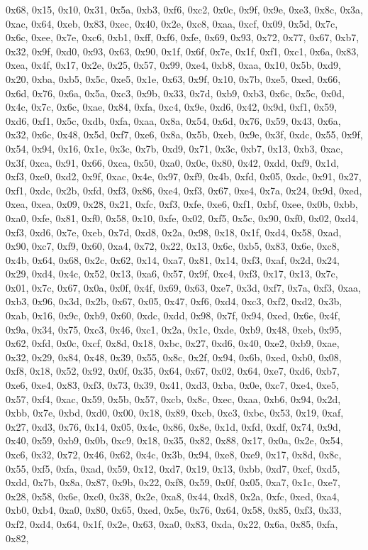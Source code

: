 \documentclass[
]{book}
\begin{document}
0x68, 0x15, 0x10, 0x31, 0x5a, 0xb3, 0xf6, 0xc2, 0x0c, 0x9f, 0x9e, 0xe3, 0x8c, 0x3a, 0xac, 0x64, 0xeb, 0x83, 0xec, 0x40, 0x2e, 0xc8, 0xaa, 0xcf, 0x09, 0x5d, 0x7c, 0x6c, 0xee, 0x7e, 0xc6, 0xb1, 0xff, 0xf6, 0xfe, 0x69, 0x93, 0x72, 0x77, 0x67, 0xb7, 0x32, 0x9f, 0xd0, 0x93, 0x63, 0x90, 0x1f, 0x6f, 0x7e, 0x1f, 0xf1, 0xc1, 0x6a, 0x83, 0xea, 0x4f, 0x17, 0x2e, 0x25, 0x57, 0x99, 0xe4, 0xb8, 0xaa, 0x10, 0x5b, 0xd9, 0x20, 0xba, 0xb5, 0x5c, 0xe5, 0x1e, 0x63, 0x9f, 0x10, 0x7b, 0xe5, 0xed, 0x66, 0x6d, 0x76, 0x6a,
0x5a, 0xc3, 0x9b, 0x33, 0x7d, 0xb9, 0xb3, 0x6c, 0x5c, 0x0d, 0x4c, 0x7c, 0x6c, 0xae, 0x84, 0xfa, 0xc4, 0x9e, 0xd6, 0x42, 0x9d, 0xf1, 0x59, 0xd6, 0xf1, 0x5c, 0xdb, 0xfa, 0xaa, 0x8a, 0x54, 0x6d, 0x76, 0x59, 0x43, 0x6a, 0x32, 0x6c, 0x48, 0x5d, 0xf7, 0xe6, 0x8a, 0x5b, 0xeb, 0x9e, 0x3f, 0xdc, 0x55, 0x9f, 0x54, 0x94, 0x16, 0x1e, 0x3c, 0x7b, 0xd9, 0x71, 0x3c, 0xb7, 0x13, 0xb3, 0xac, 0x3f, 0xca, 0x91, 0x66, 0xca, 0x50, 0xa0, 0x0c, 0x80, 0x42, 0xdd, 0xf9, 0x1d, 0xf3, 0xe0, 0xd2, 0x9f, 0xac, 0x4e, 0x97, 0xf9,
0x4b, 0xfd, 0x05, 0xdc, 0x91, 0x27, 0xf1, 0xdc, 0x2b, 0xfd, 0xf3, 0x86, 0xe4, 0xf3, 0x67, 0xe4, 0x7a, 0x24, 0x9d, 0xed, 0xea, 0xea, 0x09, 0x28, 0x21, 0xfc, 0xf3, 0xfe, 0xe6, 0xf1, 0xbf, 0xee, 0x0b, 0xbb, 0xa0, 0xfe, 0x81, 0xf0, 0x58, 0x10, 0xfe, 0x02, 0xf5, 0x5c, 0x90, 0xf0, 0x02, 0xd4, 0xf3, 0xd6, 0x7e, 0xeb, 0x7d, 0xd8, 0x2a, 0x98, 0x18, 0x1f, 0xd4, 0x58, 0xad, 0x90, 0xc7, 0xf9, 0x60, 0xa4, 0x72, 0x22, 0x13, 0x6c, 0xb5, 0x83, 0x6e, 0xc8, 0x4b, 0x64, 0x68, 0x2c, 0x62, 0x14, 0xa7, 0x81, 0x14, 0xf3,
0xaf, 0x2d, 0x24, 0x29, 0xd4, 0x4c, 0x52, 0x13, 0xa6, 0x57, 0x9f, 0xc4, 0xf3, 0x17, 0x13, 0x7c, 0x01, 0x7c, 0x67, 0x0a, 0x0f, 0x4f, 0x69, 0x63, 0xe7, 0x3d, 0xf7, 0x7a, 0xf3, 0xaa, 0xb3, 0x96, 0x3d, 0x2b, 0x67, 0x05, 0x47, 0xf6, 0xd4, 0xc3, 0xf2, 0xd2, 0x3b, 0xab, 0x16, 0x9c, 0xb9, 0x60, 0xdc, 0xdd, 0x98, 0x7f, 0x94, 0xed, 0x6e, 0x4f, 0x9a, 0x34, 0x75, 0xc3, 0x46, 0xc1, 0x2a, 0x1c, 0xde, 0xb9, 0x48, 0xeb, 0x95, 0x62, 0xfd, 0x0c, 0xcf, 0x8d, 0x18, 0xbc, 0x27, 0xd6, 0x40, 0xe2, 0xb9, 0xae, 0x32, 0x29,
0x84, 0x48, 0x39, 0x55, 0x8c, 0x2f, 0x94, 0x6b, 0xed, 0xb0, 0x08, 0xf8, 0x18, 0x52, 0x92, 0x0f, 0x35, 0x64, 0x67, 0x02, 0x64, 0xe7, 0xd6, 0xb7, 0xe6, 0xe4, 0x83, 0xf3, 0x73, 0x39, 0x41, 0xd3, 0xba, 0x0e, 0xc7, 0xe4, 0xe5, 0x57, 0xf4, 0xac, 0x59, 0x5b, 0x57, 0xcb, 0x8c, 0xec, 0xaa, 0xb6, 0x94, 0x2d, 0xbb, 0x7e, 0xbd, 0xd0, 0x00, 0x18, 0x89, 0xcb, 0xc3, 0xbc, 0x53, 0x19, 0xaf, 0x27, 0xd3, 0x76, 0x14, 0x05, 0x4c, 0x86, 0x8e, 0x1d, 0xfd, 0xdf, 0x74, 0x9d, 0x40, 0x59, 0xb9, 0x0b, 0xc9, 0x18, 0x35, 0x82,
0x88, 0x17, 0x0a, 0x2e, 0x54, 0xc6, 0x32, 0x72, 0x46, 0x62, 0x4c, 0x3b, 0x94, 0xe8, 0xe9, 0x17, 0x8d, 0x8c, 0x55, 0xf5, 0xfa, 0xad, 0x59, 0x12, 0xd7, 0x19, 0x13, 0xbb, 0xd7, 0xcf, 0xd5, 0xdd, 0x7b, 0x8a, 0x87, 0x9b, 0x22, 0xf8, 0x59, 0x0f, 0x05, 0xa7, 0x1c, 0xe7, 0x28, 0x58, 0x6e, 0xc0, 0x38, 0x2e, 0xa8, 0x44, 0xd8, 0x2a, 0xfc, 0xed, 0xa4, 0xb0, 0xb4, 0xa0, 0x80, 0x65, 0xed, 0x5e, 0x76, 0x64, 0x58, 0x85, 0xf3, 0x33, 0xf2, 0xd4, 0x64, 0x1f, 0x2e, 0x63, 0xa0, 0x83, 0xda, 0x22, 0x6a, 0x85, 0xfa, 0x82,
\end{document}
